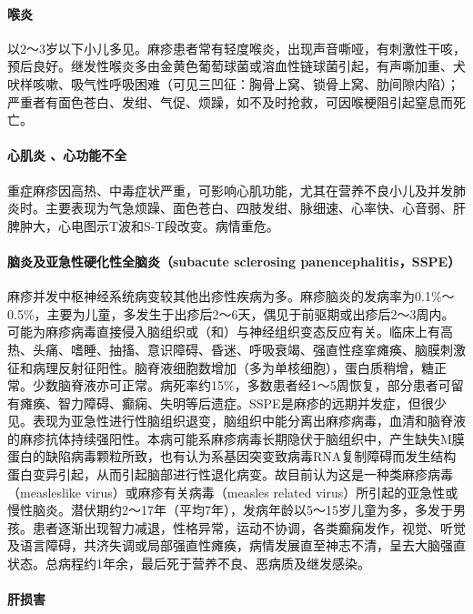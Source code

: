 \paragraph{喉炎}

以2～3岁以下小儿多见。麻疹患者常有轻度喉炎，出现声音嘶哑，有刺激性干咳，预后良好。继发性喉炎多由金黄色葡萄球菌或溶血性链球菌引起，有声嘶加重、犬吠样咳嗽、吸气性呼吸困难（可见三凹征：胸骨上窝、锁骨上窝、肋间隙内陷）；严重者有面色苍白、发绀、气促、烦躁，如不及时抢救，可因喉梗阻引起窒息而死亡。

\paragraph{心肌炎 、心功能不全}

重症麻疹因高热、中毒症状严重，可影响心肌功能，尤其在营养不良小儿及并发肺炎时。主要表现为气急烦躁、面色苍白、四肢发绀、脉细速、心率快、心音弱、肝脾肿大，心电图示T波和S-T段改变。病情重危。

\paragraph{脑炎及亚急性硬化性全脑炎（subacute sclerosing panencephalitis，SSPE）}

麻疹并发中枢神经系统病变较其他出疹性疾病为多。麻疹脑炎的发病率为0.1\%～0.5\%，主要为儿童，多发生于出疹后2～6天，偶见于前驱期或出疹后2～3周内。可能为麻疹病毒直接侵入脑组织或（和）与神经组织变态反应有关。临床上有高热、头痛、嗜睡、抽搐、意识障碍、昏迷、呼吸衰竭、强直性痉挛瘫痪、脑膜刺激征和病理反射征阳性。脑脊液细胞数增加（多为单核细胞），蛋白质稍增，糖正常。少数脑脊液亦可正常。病死率约15\%，多数患者经1～5周恢复，部分患者可留有瘫痪、智力障碍、癫痫、失明等后遗症。SSPE是麻疹的远期并发症，但很少见。表现为亚急性进行性脑组织退变，脑组织中能分离出麻疹病毒，血清和脑脊液的麻疹抗体持续强阳性。本病可能系麻疹病毒长期隐伏于脑组织中，产生缺失M膜蛋白的缺陷病毒颗粒所致，也有认为系基因突变致病毒RNA复制障碍而发生结构蛋白变异引起，从而引起脑部进行性退化病变。故目前认为这是一种类麻疹病毒（measleslike
virus）或麻疹有关病毒（measles related
virus）所引起的亚急性或慢性脑炎。潜伏期约2～17年（平均7年），发病年龄以5～15岁儿童为多，多发于男孩。患者逐渐出现智力减退，性格异常，运动不协调，各类癫痫发作，视觉、听觉及语言障碍，共济失调或局部强直性瘫痪，病情发展直至神志不清，呈去大脑强直状态。总病程约1年余，最后死于营养不良、恶病质及继发感染。

\paragraph{肝损害}

